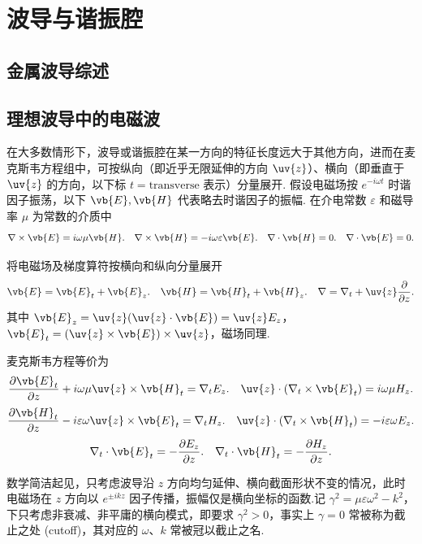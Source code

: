 \chapter{波导与谐振腔}
\section{金属波导综述}
\section{理想波导中的电磁波}
在大多数情形下，波导或谐振腔在某一方向的特征长度远大于其他方向，进而在麦克斯韦方程组中，可按纵向（即近乎无限延伸的方向 \(\uv{z}\)）、横向（即垂直于 \(\uv{z}\) 的方向，以下标 \(t = \text{transverse}\) 表示）分量展开.
假设电磁场按 \(e^{-i\omega t}\) 时谐因子振荡，以下 \(\vb{E}, \vb{H}\) 代表略去时谐因子的振幅.
在介电常数 \(\varepsilon\) 和磁导率 \(\mu\) 为常数的介质中
\begin{align*}
	\nabla \times \vb{E} = i\omega\mu \vb{H}. \quad \nabla \times \vb{H} = -i\omega\varepsilon \vb{E}. \quad \nabla \cdot \vb{H} = 0. \quad \nabla \cdot \vb{E} = 0.
\end{align*}

将电磁场及梯度算符按横向和纵向分量展开
\begin{align*}
	\vb{E} = \vb{E}_t + \vb{E}_z. \quad \vb{H} = \vb{H}_t + \vb{H}_z. \quad \nabla = \nabla_t + \uv{z} \dfrac{\partial}{\partial z}.
\end{align*}
其中 \(\vb{E}_z = \uv{z} (\uv{z} \cdot \vb{E}) = \uv{z} E_z\)，\(\vb{E}_t = (\uv{z} \times \vb{E}) \times \uv{z}\)，磁场同理.

麦克斯韦方程等价为
\begin{align*}
	\dfrac{\partial \vb{E}_t}{\partial z} + i\omega\mu \uv{z} \times \vb{H}_t = \nabla_t E_z. \quad \uv{z} \cdot (\nabla_t \times \vb{E}_t) = i\omega\mu H_z.
\end{align*}
\begin{align*}
	\dfrac{\partial \vb{H}_t}{\partial z} - i\varepsilon\omega \uv{z} \times \vb{E}_t = \nabla_t H_z. \quad \uv{z} \cdot (\nabla_t \times \vb{H}_t) = -i\varepsilon\omega E_z.
\end{align*}
\begin{align*}
	\nabla_t \cdot \vb{E}_t = -\dfrac{\partial E_z}{\partial z}. \quad \nabla_t \cdot \vb{H}_t = -\dfrac{\partial H_z}{\partial z}.
\end{align*}

数学简洁起见，只考虑波导沿 \(z\) 方向均匀延伸、横向截面形状不变的情况，此时电磁场在 \(z\) 方向以 \(e^{\pm ikz}\) 因子传播，振幅仅是横向坐标的函数.记 \(\gamma^2 = \mu\varepsilon\omega^2 - k^2\)，下只考虑非衰减、非平庸的横向模式，即要求 \(\gamma^2 > 0\)，事实上 \(\gamma = 0\) 常被称为截止之处 (cutoff)，其对应的 \(\omega\)、\(k\) 常被冠以截止之名.

